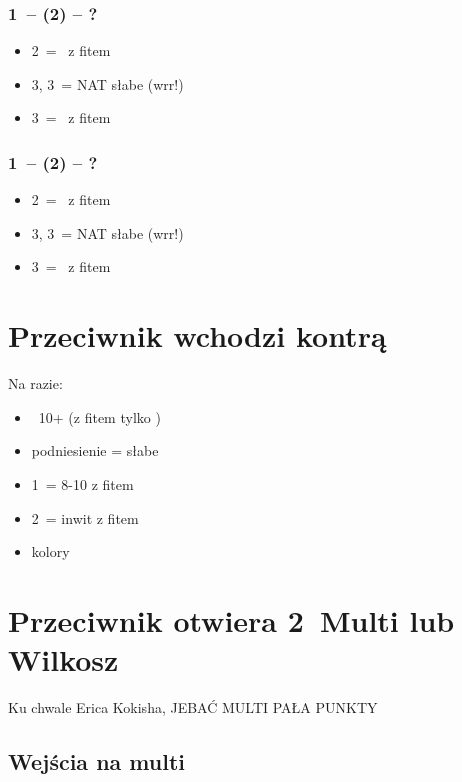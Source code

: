 \documentclass[12pt, a4paper]{article}
\begin{document}
\begin{minipage}{0.5\linewidth}
    \subsubsection*{1\hearts\ -- (2\hearts) -- ?}
    \begin{itemize}  
        \item 2\nt\ = \inv\ z fitem
        \item 3\clubs, 3\diams\ = NAT słabe (wrr!)
        \item 3\spades\ = \gf\ z fitem
    \end{itemize} 
\end{minipage}%
\begin{minipage}{0.5\linewidth}
    \subsubsection*{1\spades\ -- (2\spades) -- ?}
        \begin{itemize} 
            \item 2\nt\ = \gf\ z fitem
            \item 3\clubs, 3\diams\ = NAT słabe (wrr!)
            \item 3\hearts\ = \inv\ z fitem
        \end{itemize}
\end{minipage}

\pagebreak
\section{Przeciwnik wchodzi kontrą}
Na razie:
\begin{itemize}
    \item \rdbl\ 10+ (z fitem tylko \gf)
    \item podniesienie = słabe
    \item 1\nt\ = 8-10 z fitem
    \item 2\nt\ = inwit z fitem
    \item kolory \nf
\end{itemize}


\pagebreak
\section{Przeciwnik otwiera 2\diams\ Multi lub Wilkosz}
Ku chwale Erica Kokisha, JEBAĆ MULTI PAŁA PUNKTY 
\subsection*{Wejścia na multi}
\end{document}
